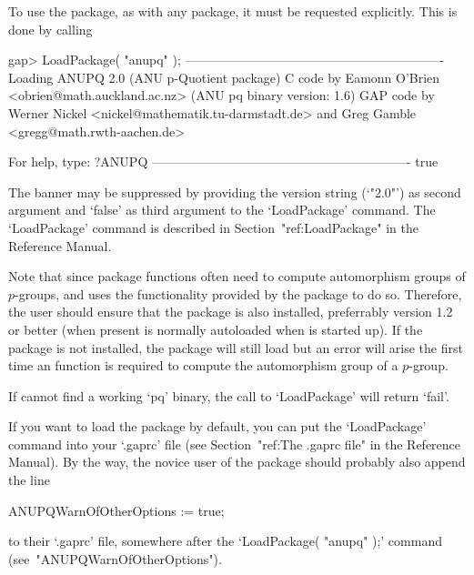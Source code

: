 \endlist


To use the {\ANUPQ} package, as with  any  {\GAP}  package,  it  must  be
requested explicitly. This is done by calling

\beginexample
gap> LoadPackage( "anupq" );
-------------------------------------------------------------
Loading ANUPQ 2.0 (ANU p-Quotient package)
C code by  Eamonn O'Brien <obrien@math.auckland.ac.nz>
           (ANU pq binary version: 1.6)
GAP code by Werner Nickel <nickel@mathematik.tu-darmstadt.de>
        and   Greg Gamble  <gregg@math.rwth-aachen.de>

            For help, type: ?ANUPQ
-------------------------------------------------------------
true
\endexample

The banner may be suppressed by providing the version string (`"2.0"') as
second argument and  `false'  as  third  argument  to  the  `LoadPackage'
command.    The     `LoadPackage'     command     is     described     in
Section~"ref:LoadPackage" in the {\GAP} Reference Manual.

Note  that  since  {\ANUPQ}  package  functions  often  need  to  compute
automorphism groups of $p$-groups, and uses the functionality provided by
the {\AutPGrp} package to do so. Therefore, the user should  ensure  that
the {\AutPGrp} package is also  installed,  preferrably  version  1.2  or
better (when present {\AutPGrp} is normally  autoloaded  when  {\GAP}  is
started up). If the {\AutPGrp} package is  not  installed,  the  {\ANUPQ}
package will still load but  an  error  will  arise  the  first  time  an
{\AutPGrp} function is required to compute the automorphism  group  of  a
$p$-group.

If {\GAP} cannot find a working `pq' binary, the  call  to  `LoadPackage'
will return `fail'.

If you want to load the {\ANUPQ} package by  default,  you  can  put  the
`LoadPackage' command  into  your  `.gaprc'  file  (see  Section~"ref:The
.gaprc file" in the {\GAP} Reference Manual). By the way, the novice user
of the {\ANUPQ} package should probably also append the line

\begintt
ANUPQWarnOfOtherOptions := true;
\endtt

to their `.gaprc' file, somewhere after  the  `LoadPackage(  "anupq"  );'
command (see~"ANUPQWarnOfOtherOptions").

